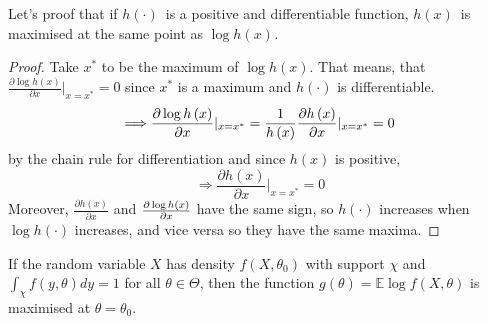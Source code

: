 \documentclass[notes=show]{beamer}
\begin{document}
\begin{frame}%

Let's proof that if $h\left( \cdot \right) $\ is a positive and
differentiable function, $h\left( x\right) $\ is maximised at the same point
as $\log h\left( x\right) $\emph{.}

\begin{proof}
Take $x^{\ast }$ to be the maximum of $\log h\left( x\right) .$ That means,
that $\frac{\partial \log h\left( x\right) }{\partial x}|_{x=x^{\ast }}=0$
since $x^{\ast }$ is a maximum and $h\left( \cdot \right) $ is
differentiable.%
\begin{equation*}
\Longrightarrow \frac{\partial \log h\left( x\right) }{\partial x}%
|_{x=x^{\ast }}=\frac{1}{h\left( x\right) }\frac{\partial h\left( x\right) }{%
\partial x}|_{x=x^{\ast }}=0
\end{equation*}%
by the chain rule for differentiation and since $h\left( x\right) $ is
positive, 
\begin{equation*}
\Longrightarrow \frac{\partial h\left( x\right) }{\partial x}|_{x=x^{\ast
}}=0
\end{equation*}%
Moreover, $\frac{\partial h\left( x\right) }{\partial x}$ and $\frac{%
\partial \log h\left( x\right) }{\partial x}$ have the same sign, so $%
h\left( \cdot \right) $ increases when $\log h\left( \cdot \right) $
increases, and vice versa so they have the same maxima.
\end{proof}

\end{frame}%

\begin{frame}%


\begin{lemma}
If the random variable $X$ has density $f\left( X,\theta _{0}\right) $ with
support $\chi $ and $\int_{\chi }f\left( y,\theta \right) dy=1$ for all $%
\theta \in \Theta $, then the function $g\left( \theta \right) =\mathbb{E}%
\log f\left( X,\theta \right) $ is maximised at $\theta =\theta _{0}$.
\end{lemma}

\end{frame}%
\end{document}
